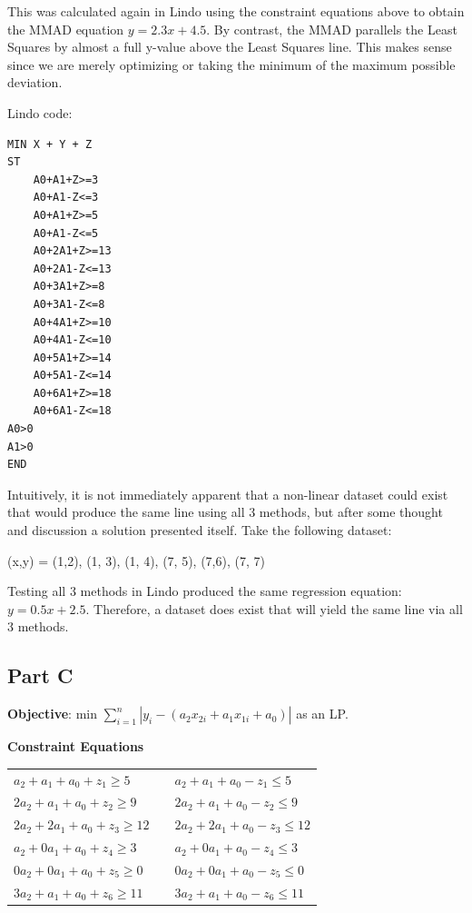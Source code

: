 \documentclass[11pt,letterpaper]{article}
\begin{document}
This was calculated again in Lindo using the constraint equations above to obtain the MMAD equation $y = 2.3x + 4.5$. By contrast, the MMAD parallels the Least Squares by almost a full y-value above the Least Squares line. This makes sense since we are merely optimizing or taking the minimum of the maximum possible deviation.\vspace{8pt}

Lindo code:\vspace{8pt}

\begin{verbatim}
MIN X + Y + Z
ST
    A0+A1+Z>=3
    A0+A1-Z<=3
    A0+A1+Z>=5
    A0+A1-Z<=5
    A0+2A1+Z>=13
    A0+2A1-Z<=13
    A0+3A1+Z>=8
    A0+3A1-Z<=8
    A0+4A1+Z>=10
    A0+4A1-Z<=10
    A0+5A1+Z>=14
    A0+5A1-Z<=14
    A0+6A1+Z>=18
    A0+6A1-Z<=18
A0>0
A1>0
END
\end{verbatim}

Intuitively, it is not immediately apparent that a non-linear dataset could exist that would produce the same line using all 3 methods, but after some thought and discussion a solution presented itself. Take the following dataset:\vspace{8pt}

\hspace{20pt}(x,y) = { (1,2), (1, 3), (1, 4), (7, 5), (7,6), (7, 7) }\vspace{8pt}

Testing all 3 methods in Lindo produced the same regression equation: $y = 0.5x + 2.5$. Therefore, a dataset does exist that will yield the same line via all 3 methods.


\subsection*{Part C}
\textbf{Objective}: min $\sum\limits_{i=1}^n |y_i -  (a_2x_{2i} + a_1x_{1i} + a_0)|$ as an LP.\vspace{8pt}

\textbf{Constraint Equations}

\begin{tabular}{l l l}
$a_2 + a_1 + a_0 + z_1 \geq 5$ & & $a_2 + a_1 + a_0 - z_1 \leq 5$\\
$2a_2 + a_1 + a_0 + z_2 \geq 9$ & & $2a_2 + a_1 + a_0 - z_2 \leq 9$\\
$2a_2 + 2a_1 + a_0 + z_3 \geq 12$ & & $2a_2 + 2a_1 + a_0 - z_3 \leq 12$\\
$a_2 + 0a_1 + a_0 + z_4 \geq 3$ & & $a_2 + 0a_1 + a_0 - z_4 \leq 3$\\
$0a_2 + 0a_1 + a_0 + z_5 \geq 0$ & & $0a_2 + 0a_1 + a_0 - z_5 \leq 0$\\
$3a_2 + a_1 + a_0 + z_6 \geq 11$ & & $3a_2 + a_1 + a_0 - z_6 \leq 11$\\
\end{tabular}\vspace{8pt}
\end{document}
